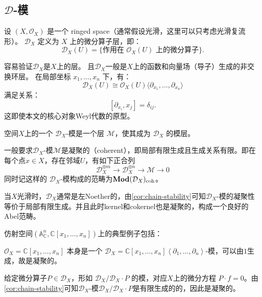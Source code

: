 \documentclass[12pt,a4paper]{ctexrep}   %
\begin{document}
\subsection{$\mathcal{D}$-模}
\begin{definition}
    设 $(X,\mathcal{O}_X)$ 是一个 ringed space（通常假设光滑，这里可以只考虑光滑复流形）。
    $\mathcal{D}_X$ 定义为 $X$ 上的微分算子层，即：
    \[
        \mathcal{D}_X(U) = \{ \text{作用在 } \mathcal{O}_X(U) \text{ 上的微分算子} \}.
    \]
\end{definition}
容易验证$\mathcal{D}_X$是$X$上的层。
且$\mathcal{D}_X$一般是$X$上的函数和向量场（导子）生成的非交换环层。
在局部坐标 $x_1,\dots,x_n$ 下，有：
\[
    \mathcal{D}_X(U) \cong \mathcal{O}_X(U)\langle \partial_{x_1},\dots,\partial_{x_n} \rangle
\]
满足关系：
\[
    [\partial_{x_i}, x_j] = \delta_{ij}.
\]
这即使本文的核心对象Weyl代数的原型。



\begin{definition}
    空间$X$上的一个 $\mathcal{D}_X$-模是一个层 $\mathcal{M}$，使其成为 $\mathcal{D}_X$ 的模层。
\end{definition}
\begin{remark}
    一般要求$\mathcal{D}_X$-模$\mathcal{M}$是凝聚的（coherent），即局部有限生成且生成关系有限。即在每个点$x\in X$，存在邻域$U$，有如下正合列
    \begin{equation*}
        \mathcal{D}_X^{\oplus m}\to \mathcal{D}_X^{\oplus n}\to \mathcal{M}\to 0
    \end{equation*}
    同时记这样的 $\mathcal{D}_X$-模构成的范畴为$\mathbf{Mod}(\mathcal{D}_X)_\text{coh}$。
\end{remark}
当$X$光滑时，$\mathcal{D}_X$通常是左Noether的，由\ref{cor:chain-stability}可知$\mathcal{D}_X$-模的凝聚性等价于局部有限生成。并且此时kernel和cokernel也是凝聚的，构成一个良好的Abel范畴。

仿射空间$\left(\mathbb{A}_{\mathbb{C}}^n,\mathbb{C}[x_1,\ldots,x_n]\right)$上的典型例子包括：
\begin{example}
    $\mathcal{O}_X=\mathbb{C}[x_1,\ldots,x_n]$ 本身是一个 $\mathcal{D}_X=\mathbb{C}[x_1,\ldots,x_n]\left\langle \partial_1,\ldots,\partial_n \right\rangle$-模，可以由$1$生成，故是凝聚的。
\end{example}
\begin{example}
    给定微分算子$P\in \mathcal{D}_X$，形如 $\mathcal{D}_X / \mathcal{D}_X \cdot P$ 的模，对应$X$上的微分方程 $P\cdot f=0$。由\ref{cor:chain-stability}可知$\mathcal{D}_X$-模$\mathcal{D}_X / \mathcal{D}_X \cdot P$是有限生成的的，因此是凝聚的。
\end{example}
\end{document}
